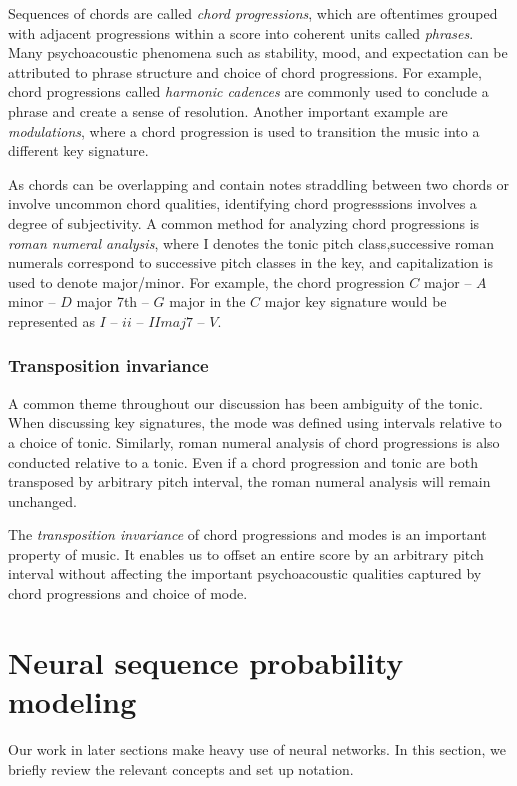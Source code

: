 \documentclass[dissertation.tex]{subfiles}
\begin{document}
Sequences of chords are called \emph{chord progressions}, which are oftentimes
grouped with adjacent progressions within a score into coherent units called
\emph{phrases}. Many psychoacoustic phenomena such as stability, mood, and
expectation can be attributed to phrase structure and choice of chord
progressions. For example, chord progressions called \emph{harmonic cadences}
are commonly used to conclude a phrase and create a sense of
resolution\cite{randel1999harvard}. Another important example are
\emph{modulations}, where a chord progression is used to transition the music
into a different key signature.

As chords can be overlapping and contain notes straddling between two chords or
involve uncommon chord qualities, identifying chord progresssions involves a
degree of subjectivity. A common method for analyzing chord progressions is
\emph{roman numeral analysis}, where I denotes the tonic pitch class,successive
roman numerals correspond to successive pitch classes in the key, and
capitalization is used to denote major/minor. For example, the chord
progression $C$ major -- $A$ minor -- $D$ major 7th -- $G$ major in the $C$
major key signature would be represented as $I$ -- $ii$ -- $IImaj7$ -- $V$.

\subsubsection{Transposition invariance}

A common theme throughout our discussion has been ambiguity of the tonic. When
discussing key signatures, the mode was defined using intervals relative to a
choice of tonic. Similarly, roman numeral analysis of chord progressions is
also conducted relative to a tonic. Even if a chord progression and tonic are
both transposed by arbitrary pitch interval, the roman numeral analysis will
remain unchanged.

The \emph{transposition invariance} of chord progressions and modes is an
important property of music. It enables us to offset an entire score by an
arbitrary pitch interval without affecting the important psychoacoustic
qualities captured by chord progressions and choice of mode.

\section{Neural sequence probability modeling}

Our work in later sections make heavy use of neural networks. In this section,
we briefly review the relevant concepts and set up notation.
\end{document}
